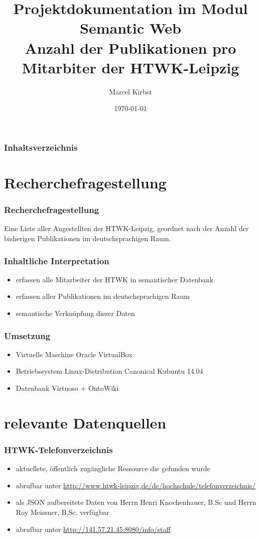 \documentclass{beamer}
\begin{document}
\title{Projektdokumentation im Modul Semantic Web\\Anzahl der Publikationen pro Mitarbiter der HTWK-Leipzig}   
\author{Marcel Kirbst} 
\date{\today}

\begin{frame}
\titlepage
\end{frame}

\begin{frame}
\frametitle{Inhaltsverzeichnis}\tableofcontents
\end{frame}

\section{Recherchefragestellung}
\begin{frame}\frametitle{Recherchefragestellung} 
Eine Liste aller Angestellten der HTWK-Leipzig, geordnet nach der Anzahl der bisherigen Publikationen im deutschsprachigen Raum.
\end{frame}


\begin{frame}\frametitle{Inhaltliche Interpretation} 
\begin{itemize}
\item erfassen alle Mitarbeiter der HTWK in semantischer Datenbank
\item erfassen aller Publikationen im deutschsprachigen Raum
\item semantische Verknüpfung dieser Daten
\end{itemize}
\end{frame}

\begin{frame}\frametitle{Umsetzung} 
\begin{itemize}
\item Virtuelle Maschine Oracle VirtualBox
\item Betriebssystem Linux-Distribution Canonical Kubuntu 14.04
\item Datenbank Virtuoso + OntoWiki
\end{itemize}
\end{frame}


\section{relevante Datenquellen}
\begin{frame}\frametitle{HTWK-Telefonverzeichnis} 
\begin{itemize}
\item aktuellste, öffentlich zugängliche Ressource die gefunden wurde
\item abrufbar unter \url{http://www.htwk-leipzig.de/de/hochschule/telefonverzeichnis/}
\item als JSON aufbereitete Daten von Herrn Henri Knochenhauer, B.Sc und Herrn Roy Meissner, B.Sc. verfügbar
\item abrufbar unter \url{http://141.57.21.45:8080/info/staff}
\end{itemize}
\end{frame}
\end{document}
